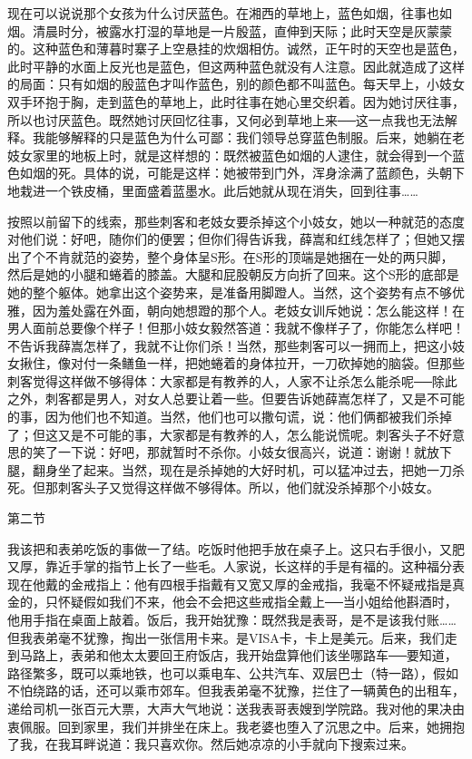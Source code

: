 现在可以说说那个女孩为什么讨厌蓝色。在湘西的草地上，蓝色如烟，往事也如烟。清晨时分，被露水打湿的草地是一片殷蓝，直伸到天际；此时天空是灰蒙蒙的。这种蓝色和薄暮时寨子上空悬挂的炊烟相仿。诚然，正午时的天空也是蓝色，此时平静的水面上反光也是蓝色，但这两种蓝色就没有人注意。因此就造成了这样的局面：只有如烟的殷蓝色才叫作蓝色，别的颜色都不叫蓝色。每天早上，小妓女双手环抱于胸，走到蓝色的草地上，此时往事在她心里交织着。因为她讨厌往事，所以也讨厌蓝色。既然她讨厌回忆往事，又何必到草地上来──这一点我也无法解释。我能够解释的只是蓝色为什么可鄙：我们领导总穿蓝色制服。后来，她躺在老妓女家里的地板上时，就是这样想的：既然被蓝色如烟的人逮住，就会得到一个蓝色如烟的死。具体的说，可能是这样：她被带到门外，浑身涂满了蓝颜色，头朝下地栽进一个铁皮桶，里面盛着蓝墨水。此后她就从现在消失，回到往事…… 

按照以前留下的线索，那些刺客和老妓女要杀掉这个小妓女，她以一种就范的态度对他们说：好吧，随你们的便罢；但你们得告诉我，薛嵩和红线怎样了；但她又摆出了个不肯就范的姿势，整个身体呈S形。在S形的顶端是她捆在一处的两只脚，然后是她的小腿和蜷着的膝盖。大腿和屁股朝反方向折了回来。这个S形的底部是她的整个躯体。她拿出这个姿势来，是准备用脚蹬人。当然，这个姿势有点不够优雅，因为羞处露在外面，朝向她想蹬的那个人。老妓女训斥她说：怎么能这样！在男人面前总要像个样子！但那小妓女毅然答道：我就不像样子了，你能怎么样吧！不告诉我薛嵩怎样了，我就不让你们杀！当然，那些刺客可以一拥而上，把这小妓女揪住，像对付一条鳝鱼一样，把她蜷着的身体拉开，一刀砍掉她的脑袋。但那些刺客觉得这样做不够得体：大家都是有教养的人，人家不让杀怎么能杀呢──除此之外，刺客都是男人，对女人总要让着一些。但要告诉她薛嵩怎样了，又是不可能的事，因为他们也不知道。当然，他们也可以撒句谎，说：他们俩都被我们杀掉了；但这又是不可能的事，大家都是有教养的人，怎么能说慌呢。刺客头子不好意思的笑了一下说：好吧，那就暂时不杀你。小妓女很高兴，说道：谢谢！就放下腿，翻身坐了起来。当然，现在是杀掉她的大好时机，可以猛冲过去，把她一刀杀死。但那刺客头子又觉得这样做不够得体。所以，他们就没杀掉那个小妓女。 



第二节 

我该把和表弟吃饭的事做一了结。吃饭时他把手放在桌子上。这只右手很小，又肥又厚，靠近手掌的指节上长了一些毛。人家说，长这样的手是有福的。这种福分表现在他戴的金戒指上：他有四根手指戴有又宽又厚的金戒指，我毫不怀疑戒指是真金的，只怀疑假如我们不来，他会不会把这些戒指全戴上──当小姐给他斟酒时，他用手指在桌面上敲着。饭后，我开始犹豫：既然我是表哥，是不是该我付账……但我表弟毫不犹豫，掏出一张信用卡来。是VISA卡，卡上是美元。后来，我们走到马路上，表弟和他太太要回王府饭店，我开始盘算他们该坐哪路车──要知道，路径繁多，既可以乘地铁，也可以乘电车、公共汽车、双层巴士（特一路），假如不怕绕路的话，还可以乘市郊车。但我表弟毫不犹豫，拦住了一辆黄色的出租车，递给司机一张百元大票，大声大气地说：送我表哥表嫂到学院路。我对他的果决由衷佩服。回到家里，我们并排坐在床上。我老婆也堕入了沉思之中。后来，她拥抱了我，在我耳畔说道：我只喜欢你。然后她凉凉的小手就向下搜索过来。 

